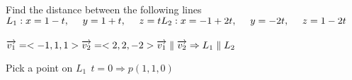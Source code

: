 \begin{example}
Find the distance between the following lines \\
$L_1 : x=1-t ,~~~~ y=1+t, ~~~~ z=t \\
L_2 : x=-1+2t ,~~~~ y=-2t ,~~~~ z=1-2t $  \\
{} \\
$\overrightarrow{v_1}=<-1,1,1> \\
\overrightarrow{v_2}=<2,2,-2> \\
\overrightarrow{v_1} \parallel \overrightarrow{v_2} \Rightarrow L_1 \parallel L_2 $ \\
\begin{exercise}
Pick a point on $L_1 ~~ t=0 \Rightarrow p(1,1,0)$
\end{exercise}
\end{example}
